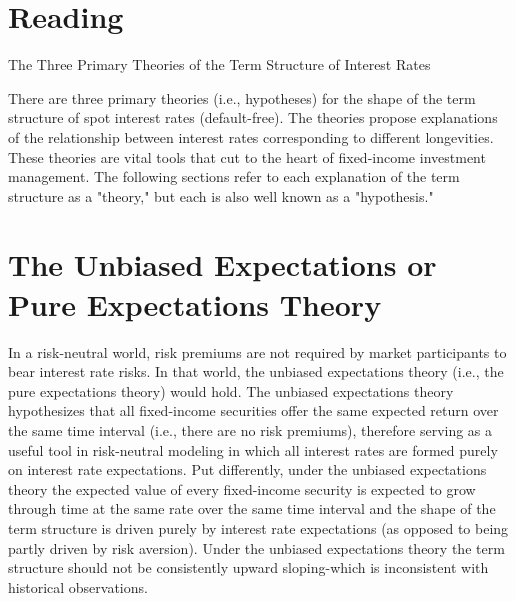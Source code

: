 \documentclass[11pt]{article}
\begin{document}
\section*{Reading}
The Three Primary Theories of the Term Structure of Interest Rates

There are three primary theories (i.e., hypotheses) for the shape of the term structure of spot interest rates (default-free). The theories propose explanations of the relationship between interest rates corresponding to different longevities. These theories are vital tools that cut to the heart of fixed-income investment management. The following sections refer to each explanation of the term structure as a "theory," but each is also well known as a "hypothesis."

\section*{The Unbiased Expectations or Pure Expectations Theory}
In a risk-neutral world, risk premiums are not required by market participants to bear interest rate risks. In that world, the unbiased expectations theory (i.e., the pure expectations theory) would hold. The unbiased expectations theory hypothesizes that all fixed-income securities offer the same expected return over the same time interval (i.e., there are no risk premiums), therefore serving as a useful tool in risk-neutral modeling in which all interest rates are formed purely on interest rate expectations. Put differently, under the unbiased expectations theory the expected value of every fixed-income security is expected to grow through time at the same rate over the same time interval and the shape of the term structure is driven purely by interest rate expectations (as opposed to being partly driven by risk aversion). Under the unbiased expectations theory the term structure should not be consistently upward sloping-which is inconsistent with historical observations.
\end{document}
